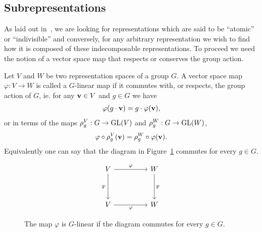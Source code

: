 \subsection{Subrepresentations}\label{sect:subrepr}

As laid out in~\cite[Sect.1.2.]{FultonHarris}, we are looking for representations which are said to be ``atomic'' or ``indivisible'' and conversely, for any arbitrary representation we wish to find how it is composed of these indecomposable representations. To proceed we need the notion of a vector space map that respects or conserves the group action.	

\begin{definition}\cite{FultonHarris}
	Let $V$ and $W$ be two representation spaces of a group $G$. A vector space map 
		$\varphi: V \rightarrow W$
	is called a $G$-linear map if it commutes with, or respects, the group action of $G$, ie. for any $\mathbf{v} \in V$ and $g \in G$ we have
	\begin{align*}
		\varphi( g \cdot \mathbf{v} ) = g \cdot \varphi (\mathbf{v}),
	\end{align*}
	or in terms of the maps $\rho_g^V: G \rightarrow \text{GL}(V)$ and $\rho_g^W: G \rightarrow \text{GL}(W)$,
	\begin{align*}
		\varphi \circ \rho^V_g (\mathbf{v}) = \rho^W_g \circ \varphi (\mathbf{v}).
	\end{align*}
	Equivalently one can say that the diagram in Figure~\ref*{fig:commapmorp} commutes for every $g \in G$.
	\begin{figure}[hbt!]
		\centering
		\[\begin{tikzcd}
			V && W \\
			\\
			V && W
			\arrow["\varphi", from=1-1, to=1-3]
			\arrow["g\cdot"', from=1-1, to=3-1]
			\arrow["g\cdot", from=1-3, to=3-3]
			\arrow["\varphi"', from=3-1, to=3-3]
		\end{tikzcd}\]
		\caption{The map $\varphi$ is $G$-linear if the diagram commutes for every $g \in G$.}
		\label{fig:commapmorp}
	\end{figure}
\end{definition}

